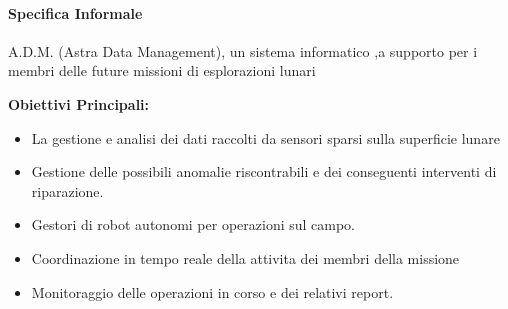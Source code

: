 \paragraph{Specifica Informale} 
A.D.M. (Astra Data Management), un sistema informatico ,a supporto per i membri delle future missioni di esplorazioni lunari

\textbf{Obiettivi Principali:}
\begin{itemize}
\item  La gestione e analisi dei dati raccolti da sensori sparsi sulla superficie lunare 
\item  Gestione delle possibili anomalie riscontrabili e dei conseguenti interventi di riparazione.
\item  Gestori di robot autonomi per operazioni sul campo.
\item  Coordinazione in tempo reale della attivita dei membri della missione
\item  Monitoraggio delle operazioni in corso e dei relativi report.
\end{itemize}